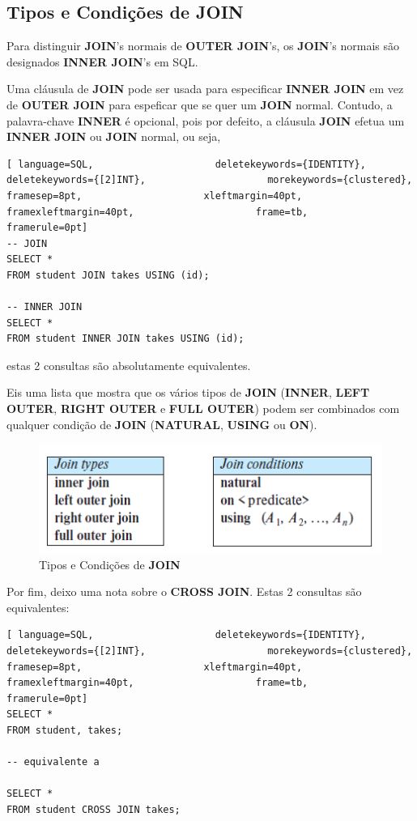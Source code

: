 \documentclass[oneside]{book}
\theoremstyle{definition}
\begin{document}
\subsection{Tipos e Condições de JOIN}
Para distinguir \textbf{JOIN}'s normais de \textbf{OUTER JOIN}'s, os \textbf{JOIN}'s normais são designados \textbf{INNER JOIN}'s em SQL.

Uma cláusula de \textbf{JOIN} pode ser usada para especificar \textbf{INNER JOIN} em vez de \textbf{OUTER JOIN} para espeficar que se quer um \textbf{JOIN} normal. Contudo, a palavra-chave \textbf{INNER} é opcional, pois por defeito, a cláusula \textbf{JOIN} efetua um \textbf{INNER JOIN} ou \textbf{JOIN} normal, ou seja,

\begin{lstlisting}[ language=SQL,                     deletekeywords={IDENTITY},                     deletekeywords={[2]INT},                     morekeywords={clustered},                     framesep=8pt,                     xleftmargin=40pt,                     framexleftmargin=40pt,                     frame=tb,                     framerule=0pt]
-- JOIN
SELECT *
FROM student JOIN takes USING (id);

-- INNER JOIN
SELECT *
FROM student INNER JOIN takes USING (id);
\end{lstlisting}
estas 2 consultas são absolutamente equivalentes.

Eis uma lista que mostra que os vários tipos de \textbf{JOIN} (\textbf{INNER}, \textbf{LEFT OUTER}, \textbf{RIGHT OUTER} e \textbf{FULL OUTER}) podem ser combinados com qualquer condição de \textbf{JOIN} (\textbf{NATURAL}, \textbf{USING} ou \textbf{ON}).

\begin{figure}[H]
    \centering
    \includegraphics[scale = 0.6]{cap2/join_tipos_conds.png}
    \caption{Tipos e Condições de \textbf{JOIN}}
\end{figure}

Por fim, deixo uma nota sobre o \textbf{CROSS JOIN}. Estas 2 consultas são equivalentes:
\begin{lstlisting}[ language=SQL,                     deletekeywords={IDENTITY},                     deletekeywords={[2]INT},                     morekeywords={clustered},                     framesep=8pt,                     xleftmargin=40pt,                     framexleftmargin=40pt,                     frame=tb,                     framerule=0pt]
SELECT *
FROM student, takes;

-- equivalente a

SELECT *
FROM student CROSS JOIN takes;
\end{lstlisting}
\end{document}
